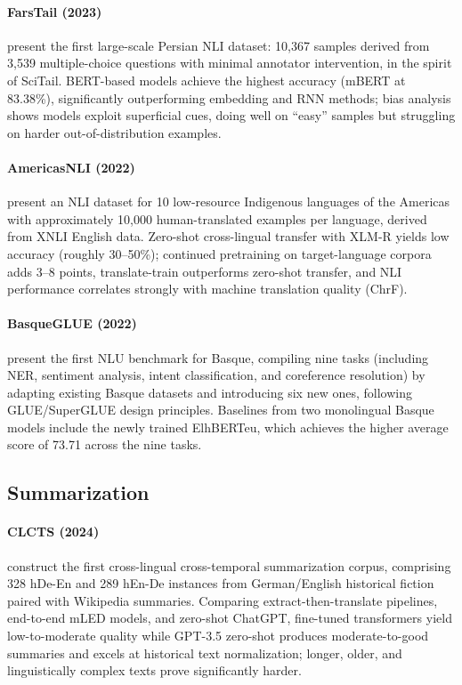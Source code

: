 \documentclass[letterpaper]{article}
\begin{document}
\paragraph{FarsTail (2023)} \citet{Amirkhani_2023} present the first large-scale Persian NLI dataset: 10,367 samples derived from 3,539 multiple-choice questions with minimal annotator intervention, in the spirit of SciTail. BERT-based models achieve the highest accuracy (mBERT at 83.38\%), significantly outperforming embedding and RNN methods; bias analysis shows models exploit superficial cues, doing well on ``easy'' samples but struggling on harder out-of-distribution examples.

\paragraph{AmericasNLI (2022)} \citet{10.3389/frai.2022.995667} present an NLI dataset for 10 low-resource Indigenous languages of the Americas with approximately 10,000 human-translated examples per language, derived from XNLI English data. Zero-shot cross-lingual transfer with XLM-R yields low accuracy (roughly 30--50\%); continued pretraining on target-language corpora adds 3--8 points, translate-train outperforms zero-shot transfer, and NLI performance correlates strongly with machine translation quality (ChrF).

\paragraph{BasqueGLUE (2022)} \citet{urbizu2022basqueglue} present the first NLU benchmark for Basque, compiling nine tasks (including NER, sentiment analysis, intent classification, and coreference resolution) by adapting existing Basque datasets and introducing six new ones, following GLUE/SuperGLUE design principles. Baselines from two monolingual Basque models include the newly trained ElhBERTeu, which achieves the higher average score of 73.71 across the nine tasks.

\subsection{Summarization}

\paragraph{CLCTS (2024)} \citet{zhang2024crosslingualcrosstemporalsummarizationdataset} construct the first cross-lingual cross-temporal summarization corpus, comprising 328 hDe-En and 289 hEn-De instances from German/English historical fiction paired with Wikipedia summaries. Comparing extract-then-translate pipelines, end-to-end mLED models, and zero-shot ChatGPT, fine-tuned transformers yield low-to-moderate quality while GPT-3.5 zero-shot produces moderate-to-good summaries and excels at historical text normalization; longer, older, and linguistically complex texts prove significantly harder.
\end{document}
